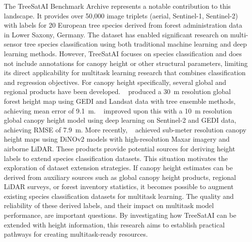 The TreeSatAI Benchmark Archive represents a notable contribution to this landscape. It provides over 50{,}000 image triplets (aerial, Sentinel-1, Sentinel-2) with labels for 20 European tree species derived from forest administration data in Lower Saxony, Germany. The dataset has enabled significant research on multi-sensor tree species classification using both traditional machine learning and deep learning methods. However, TreeSatAI focuses on species classification and does not include annotations for canopy height or other structural parameters, limiting its direct applicability for multitask learning research that combines classification and regression objectives. For canopy height specifically, several global and regional products have been developed. ~\cite{potapov_mapping_2021} produced a 30~m resolution global forest height map using GEDI and Landsat data with tree ensemble methods, achieving mean error of 9.1~m. ~\cite{lang_high-resolution_2023} improved upon this with a 10~m resolution global canopy height model using deep learning on Sentinel-2 and GEDI data, achieving RMSE of 7.9~m. More recently, ~\cite{tolan_very_2024} achieved sub-meter resolution canopy height maps using DiNOv2 models with high-resolution Maxar imagery and airborne LiDAR. These products provide potential sources for deriving height labels to extend species classification datasets. This situation motivates the exploration of dataset extension strategies. If canopy height estimates can be derived from auxiliary sources such as global canopy height products, regional LiDAR surveys, or forest inventory statistics, it becomes possible to augment existing species classification datasets for multitask learning. The quality and reliability of these derived labels, and their impact on multitask model performance, are important questions. By investigating how TreeSatAI can be extended with height information, this research aims to establish practical pathways for creating multitask-ready resources.

